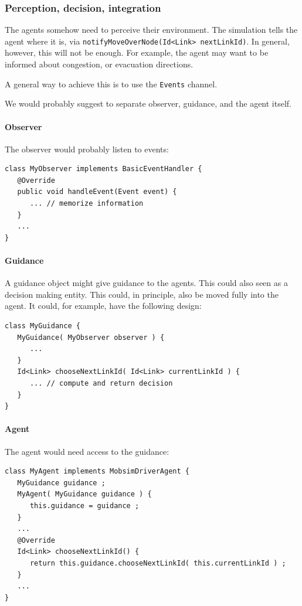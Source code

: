 \subsubsection{Perception, decision, integration}

The agents somehow need to perceive their environment.  The simulation tells the agent where it is, via \verb$notifyMoveOverNode(Id<Link> nextLinkId)$.  In general, however, this will not be enough.  For example, the agent may want to be informed about congestion, or evacuation directions.

A general way to achieve this is to use the \verb$Events$ channel.

We would probably suggest to separate observer, guidance, and the agent itself.

\paragraph{Observer}

The observer would probably listen to events:
\begin{lstlisting}
class MyObserver implements BasicEventHandler {
   @Override
   public void handleEvent(Event event) {
      ... // memorize information
   }
   ...
}
\end{lstlisting}

\paragraph{Guidance}

A guidance object might give guidance to the agents.  This could also seen as a decision making entity.  This could, in principle, also be moved fully into the agent.  It could, for example, have the following design:
\begin{lstlisting}
class MyGuidance {
   MyGuidance( MyObserver observer ) {
      ...
   }
   Id<Link> chooseNextLinkId( Id<Link> currentLinkId ) {
      ... // compute and return decision
   }
}
\end{lstlisting}

\paragraph{Agent}

The agent would need access to the guidance:
\begin{lstlisting}
class MyAgent implements MobsimDriverAgent {
   MyGuidance guidance ;
   MyAgent( MyGuidance guidance ) {
      this.guidance = guidance ;
   }  
   ...
   @Override
   Id<Link> chooseNextLinkId() {
      return this.guidance.chooseNextLinkId( this.currentLinkId ) ;
   }
   ...
}
\end{lstlisting}

